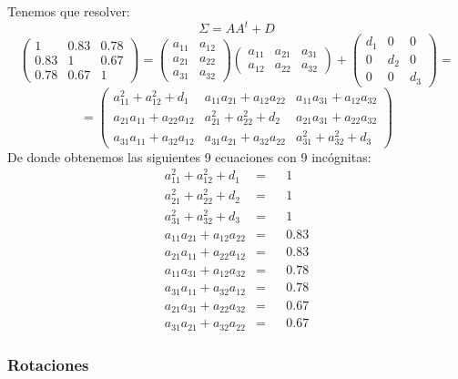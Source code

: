\documentclass[11pt,a4paper]{article}
\begin{document}
Tenemos que resolver:
$$\Sigma = AA^{t} + D$$
$$\begin{pmatrix}
1 & 0.83 & 0.78 \\
0.83 & 1 & 0.67 \\
0.78 & 0.67 & 1
\end{pmatrix} = \begin{pmatrix}
a_{11} & a_{12} \\
a_{21} & a_{22} \\
a_{31} & a_{32}
\end{pmatrix} \begin{pmatrix}
a_{11} & a_{21} & a_{31} \\
a_{12} & a_{22} & a_{32}
\end{pmatrix} + \begin{pmatrix}
d_{1} & 0 & 0 \\
0 & d_{2} & 0 \\
0 & 0 & d_{3}
\end{pmatrix} =$$
$$= \begin{pmatrix}
a_{11}^{2} + a_{12}^{2} + d_{1} & a_{11}a_{21} + a_{12}a_{22} & a_{11}a_{31} + a_{12}a_{32} \\
a_{21}a_{11} + a_{22}a_{12} & a_{21}^{2} + a_{22}^{2} + d_{2} & a_{21}a_{31} + a_{22}a_{32} \\
a_{31}a_{11} + a_{32}a_{12} & a_{31}a_{21} + a_{32}a_{22} & a_{31}^{2} + a_{32}^{2} + d_{3}
\end{pmatrix}$$
De donde obtenemos las siguientes 9 ecuaciones con 9 incógnitas:
$$\begin{aligned}
a_{11}^{2} + a_{12}^{2} + d_{1} & = & & 1 \\
a_{21}^{2} + a_{22}^{2} + d_{2} & = & & 1 \\
a_{31}^{2} + a_{32}^{2} + d_{3} & = & & 1 \\
a_{11}a_{21} + a_{12}a_{22} & = & & 0.83 \\
a_{21}a_{11} + a_{22}a_{12} & = & & 0.83 \\
a_{11}a_{31} + a_{12}a_{32} & = & & 0.78 \\
a_{31}a_{11} + a_{32}a_{12} & = & & 0.78 \\
a_{21}a_{31} + a_{22}a_{32} & = & & 0.67 \\
a_{31}a_{21} + a_{32}a_{22} & = & & 0.67
\end{aligned}$$

\subsubsection{Rotaciones}
\end{document}
